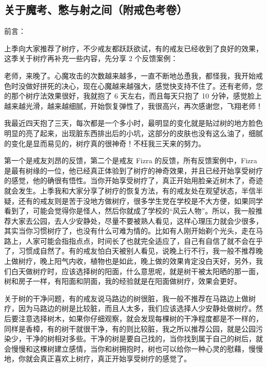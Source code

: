 \subsection{关于魔考、憋与射之间（附戒色考卷）}

前言：

上季向大家推荐了树疗，不少戒友都跃跃欲试，有的戒友已经收到了良好的效果，这季关于树疗再补充一些内容，先分享 2 个反馈案例：

\begin{case}
    老师，来晚了。心魔攻击的次数越来越多，一直不断地怂恿我，都怪我，我开始戒色时没做好拼死的决心，现在心魔越来越强大，感觉快支持不住了。还有老师，您的那个树疗法效果很好，我就抱了 6 天左右，而且每天只抱了 10 分钟，感觉脸上越来越光滑，越来越细腻，开始恢复弹性了，我很高兴，再次感谢您，飞翔老师！
\end{case}

\begin{case}
    我最近四天抱了三天，每次都是一个多小时，最明显的变化就是贴过树的地方脸色明显的亮了起来，出现脏东西排出后的小坑，这部分的皮肤也没有这么油了，细腻的变化是显而易见的，树疗真的很神奇！不枉我三天来的努力。
\end{case}

第一个是戒友刘昂的反馈，第二个是戒友 Fizra 的反馈，所有反馈案例中，Fizra 是最有树缘的一位，他已经真正体验到了树疗的神奇效果，并且已经开始享受树疗的感觉，他的确很有悟性。当你开始享受树疗了，真正开始用脸亲近树木了，奇迹就会发生。上季我和大家分享了树疗的恢复方法，有的戒友处在观望状态，半信半疑，还有的戒友则是苦于没地方做树疗，很多学生党在学校是不大方便，如果同学看到了，可能会觉得你是怪人，然后你就成了学校的“风云人物”。所以，我一般推荐大家去公园，去人少安静处，尽量不要被熟人看见，这样心理压力就会少很多，其实当你习惯树疗了，也没有什么可难为情的。比如有人刚开始剃个光头，走在马路上，人家可能会指指点点，时间长了也就完全适应了，自己有自信了就不会在乎了，习惯成自然了。有的戒友怕白天被别人看见，说晚上行不行，我一般不推荐晚上做树疗，晚上阳气内收，植物也是如此，晚上做的效果肯定没白天好，另外，我们白天做树疗时，应该选择树的阳面，什么意思呢，就是树干被太阳晒的那一面，树和房子一样，有阳面和阴面，我的经验就是在阳面做树疗，效果会更好。

关于树的干净问题，有的戒友说马路边的树很脏，我一般不推荐在马路边上做树疗，因为马路边的树是比较脏，而且人太多，我们应该选择人少安静处做树疗。然后要注意选择树木，如果你仔细观察，就会发现每棵树的干净程度都是不一样的，同样是香樟，有的树干就很干净，有的则比较脏，我之所以推荐公园，就是公园污染少，干净的树相对多些。干净的树是要自己找的，当你找到属于自己的树后，就会慢慢和这棵树建立感情，当你和树拥抱时，树也可以给你一种心灵的慰藉，慢慢地，你就会真正喜欢上树疗，真正开始享受树疗的感觉了。

